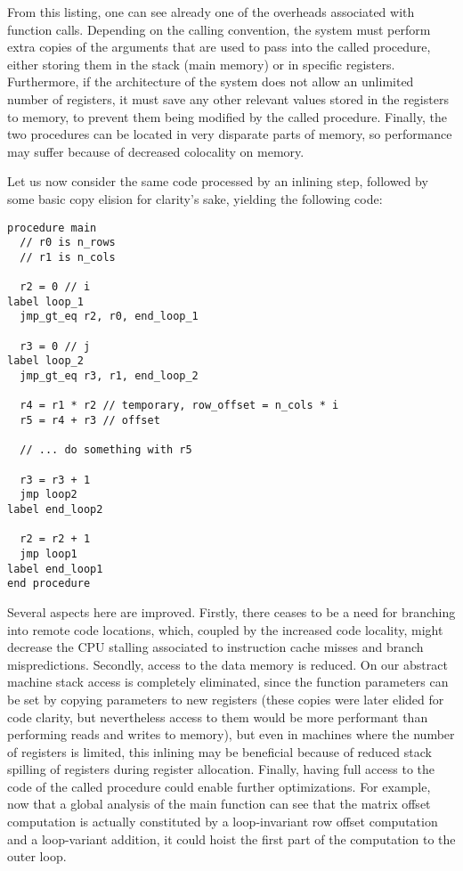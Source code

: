 From this listing, one can see already one of the overheads associated with function calls. Depending on the calling convention, the system must perform extra copies of the arguments that are used to pass into the called procedure, either storing them in the stack (main memory) or in specific registers. Furthermore, if the architecture of the system does not allow an unlimited number of registers, it must save any other relevant values stored in the registers to memory, to prevent them being modified by the called procedure. Finally, the two procedures can be located in very disparate parts of memory, so performance may suffer because of decreased colocality on memory.

Let us now consider the same code processed by an inlining step, followed by some basic copy elision for clarity's sake, yielding the following code:

\begin{lstlisting}
procedure main
  // r0 is n_rows
  // r1 is n_cols
  
  r2 = 0 // i
label loop_1
  jmp_gt_eq r2, r0, end_loop_1
  
  r3 = 0 // j
label loop_2
  jmp_gt_eq r3, r1, end_loop_2
  
  r4 = r1 * r2 // temporary, row_offset = n_cols * i
  r5 = r4 + r3 // offset
  
  // ... do something with r5
  
  r3 = r3 + 1
  jmp loop2
label end_loop2

  r2 = r2 + 1
  jmp loop1
label end_loop1
end procedure
\end{lstlisting}

Several aspects here are improved. Firstly, there ceases to be a need for branching into remote code locations, which, coupled by the increased code locality, might decrease the CPU stalling associated to instruction cache misses and branch mispredictions. Secondly, access to the data memory is reduced. On our abstract machine stack access is completely eliminated, since the function parameters can be set by copying parameters to new registers (these copies were later elided for code clarity, but nevertheless access to them would be more performant than performing reads and writes to memory), but even in machines where the number of registers is limited, this inlining may be beneficial because of reduced stack spilling of registers during register allocation. Finally, having full access to the code of the called procedure could enable further optimizations. For example, now that a global analysis of the main function can see that the matrix offset computation is actually constituted by a loop-invariant row offset computation and a loop-variant addition, it could hoist the first part of the computation to the outer loop.

